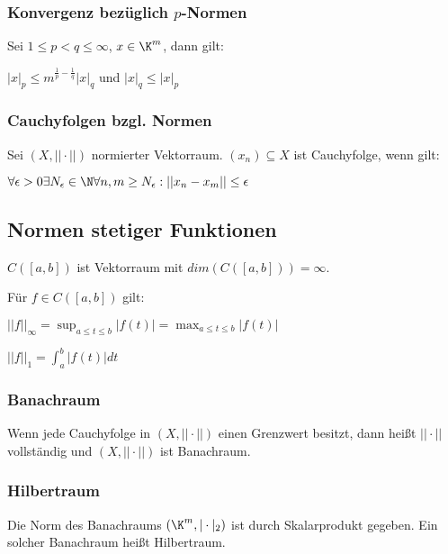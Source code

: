 \subsubsection*{Konvergenz bezüglich $p$-Normen}

Sei $1 \leq p < q \leq \infty$, $x \in \K^m$, dann gilt:

$|x|_p \leq m^{\frac{1}{p} - \frac{1}{q}} |x|_q$ und $|x|_q \leq |x|_p$

\subsubsection*{Cauchyfolgen bzgl. Normen}

Sei $(X, ||\cdot||)$ normierter Vektorraum. $(x_n) \subseteq X$ ist Cauchyfolge, wenn gilt:

$\forall \epsilon > 0 \exists N_\epsilon \in \N \forall n, m \geq N_\epsilon : ||x_n - x_m|| \leq \epsilon$

\subsection*{Normen stetiger Funktionen}

$C([a, b])$ ist Vektorraum mit $dim(C([a, b])) = \infty$.

Für $f \in C([a, b])$ gilt:

\begin{description}[leftmargin=!,labelwidth=15mm]
	\item[Supnorm] $||f||_\infty = \displaystyle\sup_{a\leq t \leq b} |f(t)| = \displaystyle\max_{a\leq t\leq b} |f(t)|$
	\item[1-Norm] $||f||_1 = \int_a^b |f(t)| dt$
\end{description}

\subsubsection*{Banachraum}

Wenn jede Cauchyfolge in $(X, ||\cdot||)$ einen Grenzwert besitzt, dann heißt $||\cdot||$ vollständig und $(X, ||\cdot||)$ ist Banachraum.

\subsubsection*{Hilbertraum}

Die Norm des Banachraums $(\K^m, |\cdot|_2)$ ist durch Skalarprodukt gegeben. Ein solcher Banachraum heißt Hilbertraum.

